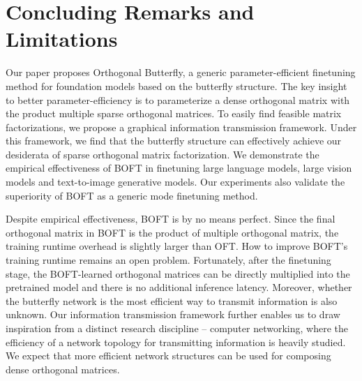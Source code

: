 

\section{Concluding Remarks and Limitations}

Our paper proposes Orthogonal Butterfly, a generic parameter-efficient finetuning method for foundation models based on the butterfly structure. The key insight to better parameter-efficiency is to parameterize a dense orthogonal matrix with the product multiple sparse orthogonal matrices. To easily find feasible matrix factorizations, we propose a graphical information transmission framework. Under this framework, we find that the butterfly structure can effectively achieve our desiderata of sparse orthogonal matrix factorization. We demonstrate the empirical effectiveness of BOFT in finetuning large language models, large vision models and text-to-image generative models. Our experiments also validate the superiority of BOFT as a generic mode finetuning method.

Despite empirical effectiveness, BOFT is by no means perfect. Since the final orthogonal matrix in BOFT is the product of multiple orthogonal matrix, the training runtime overhead is slightly larger than OFT. How to improve BOFT's training runtime remains an open problem. Fortunately, after the finetuning stage, the BOFT-learned orthogonal matrices can be directly multiplied into the pretrained model and there is no additional inference latency. Moreover, whether the butterfly network is the most efficient way to transmit information is also unknown. Our information transmission framework further enables us to draw inspiration from a distinct research discipline -- computer networking, where the efficiency of a network topology for transmitting information is heavily studied. We expect that more efficient network structures can be used for composing dense orthogonal matrices.

